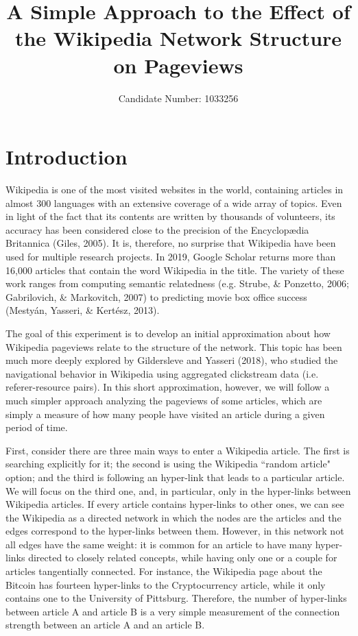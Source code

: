 \documentclass[11pt]{article}
\title{A Simple Approach to the Effect of the Wikipedia Network Structure on Pageviews}
\author{Candidate Number: 1033256}
\begin{document}
\maketitle

\section{Introduction}

Wikipedia is one of the most visited websites in the world, containing articles in almost 300 languages with an extensive coverage of a wide array of topics. Even in light of the fact that its contents are written by thousands of volunteers, its accuracy has been considered close to the precision of the Encyclopædia Britannica (Giles, 2005). It is, therefore, no surprise that Wikipedia have been used for multiple research projects. In 2019, Google Scholar returns more than 16,000 articles that contain the word Wikipedia in the title. The variety of these work ranges from computing semantic relatedness (e.g. Strube, \& Ponzetto, 2006; Gabrilovich, \& Markovitch, 2007) to predicting movie box office success (Mestyán, Yasseri, \& Kertész, 2013).

The goal of this experiment is to develop an initial approximation about how Wikipedia pageviews relate to the structure of the network. This topic has been much more deeply explored by Gildersleve and Yasseri (2018), who studied the navigational behavior in Wikipedia using aggregated clickstream data (i.e. referer-resource pairs). In this short approximation, however, we will follow a much simpler approach analyzing the pageviews of some articles, which are simply a measure of how many people have visited an article during a given period of time. 

First, consider there are three main ways to enter a Wikipedia article. The first is searching explicitly for it; the second is using the Wikipedia ``random article" option; and the third is following an hyper-link that leads to a particular article. We will focus on the third one, and, in particular, only in the hyper-links between Wikipedia articles. If every article contains hyper-links to other ones, we can see the Wikipedia as a directed network in which the nodes are the articles and the edges correspond to the hyper-links between them. However, in this network not all edges have the same weight: it is common for an article to have many hyper-links directed to closely related concepts, while having only one or a couple for articles tangentially connected. For instance, the Wikipedia page about the Bitcoin has fourteen hyper-links to the Cryptocurrency article, while it only contains one to the University of Pittsburg. Therefore, the number of hyper-links between article A and article B is a very simple measurement of the connection strength between an article A and an article B.
\end{document}
